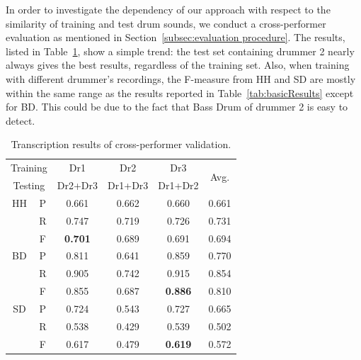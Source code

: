 \documentclass[a4paper]{article}
\newcommand{\secref}[1]{\mbox{Section~\ref{#1}}}
\newcommand{\tabref}[1]{\mbox{Table~\ref{#1}}}
\begin{document}
In order to investigate the dependency of our approach with respect to the similarity of training and test drum sounds, we conduct a cross-performer evaluation as mentioned in \secref{subsec:evaluation procedure}. %
The results, listed in \tabref{tab:crossResults}, show a simple trend: the test set containing drummer 2 nearly always gives the best results, regardless of the training set. Also, when training with different drummer's recordings, the F-measure from HH and SD are mostly within the same range as the results reported in \tabref{tab:basicResults} except for BD. This could be due to the fact that Bass Drum of drummer 2 is easy to detect.
\begin{table}[t]
\begin{footnotesize}
\begin{center}
\begin{tabular}{|c|c|c|c|c|c|}
\hline
\multicolumn{2}{|c|}{Training} & Dr1            & Dr2     & Dr3            & \multirow{2}{*}{Avg.} \\ \cline{1-5}
\multicolumn{2}{|c|}{Testing}  & Dr2+Dr3        & Dr1+Dr3 & Dr1+Dr2        &                       \\ \hline
HH             & P             & 0.661          & 0.662   & 0.660          & 0.661                 \\ \hline
               & R             & 0.747          & 0.719   & 0.726          & 0.731                 \\ \hline
               & F             & \textbf{0.701} & 0.689   & 0.691          & 0.694                 \\ \hline
BD             & P             & 0.811          & 0.641   & 0.859          & 0.770                 \\ \hline
               & R             & 0.905          & 0.742   & 0.915          & 0.854                 \\ \hline
               & F             & 0.855          & 0.687   & \textbf{0.886} & 0.810                 \\ \hline
SD             & P             & 0.724          & 0.543   & 0.727          & 0.665                 \\ \hline
               & R             & 0.538          & 0.429   & 0.539          & 0.502                 \\ \hline
               & F             & 0.617          & 0.479   & \textbf{0.619} & 0.572                 \\ \hline
\end{tabular}
 \caption{Transcription results of cross-performer validation.}
 \label{tab:crossResults}
 \end{center}
\end{footnotesize}
\end{table}
\end{document}
